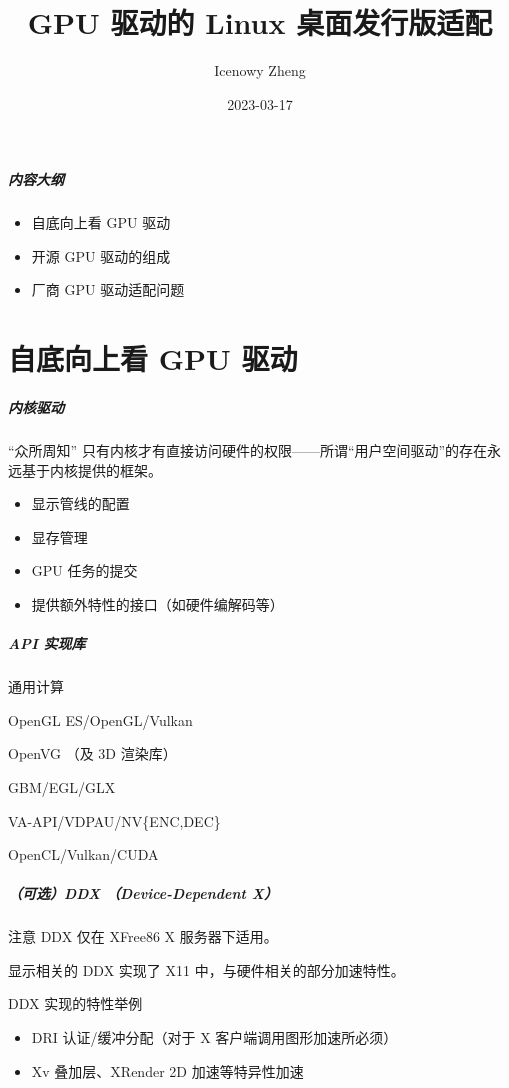 \documentclass{ctexbeamer}
\title{GPU 驱动的 Linux 桌面发行版适配}
\author{Icenowy Zheng}
\institute{PLCT 实验室}
\date{2023-03-17}
\begin{document}
\frame{\titlepage}

\begin{frame}
    \frametitle{内容大纲}
    \begin{itemize}
        \item 自底向上看 GPU 驱动
        \item 开源 GPU 驱动的组成
        \item 厂商 GPU 驱动适配问题
    \end{itemize}
\end{frame}


\part{自底向上看 GPU 驱动}
\frame{\partpage}

\begin{frame}
    \frametitle{内核驱动}
    \begin{block}{“众所周知”}
        只有内核才有直接访问硬件的权限——所谓“用户空间驱动”的存在永远基于内核提供的框架。
    \end{block}
    \begin{itemize}
        \item 显示管线的配置
        \item 显存管理
        \item GPU 任务的提交
        \item 提供额外特性的接口（如硬件编解码等）
    \end{itemize}
\end{frame}

\begin{frame}
    \frametitle{API 实现库}
    \begin{labeling}{通用计算}
        \item [3D 渲染] OpenGL ES/OpenGL/Vulkan
        \item [2D 渲染] OpenVG （及 3D 渲染库）
        \item [资源管理] GBM/EGL/GLX
        \item [硬件解码] VA-API/VDPAU/NV\{ENC,DEC\}
        \item [通用计算] OpenCL/Vulkan/CUDA
    \end{labeling}
\end{frame}

\begin{frame}
    \frametitle{（可选）DDX （Device-Dependent X）}
    \begin{alertblock}{注意}
        DDX 仅在 XFree86 X 服务器下适用。
    \end{alertblock}
    显示相关的 DDX 实现了 X11 中，与硬件相关的部分加速特性。
    \begin{block}{DDX 实现的特性举例}
        \begin{itemize}
            \item DRI 认证/缓冲分配（对于 X 客户端调用图形加速所必须）
            \item Xv 叠加层、XRender 2D 加速等特异性加速
        \end{itemize}
    \end{block}
\end{frame}
\end{document}
